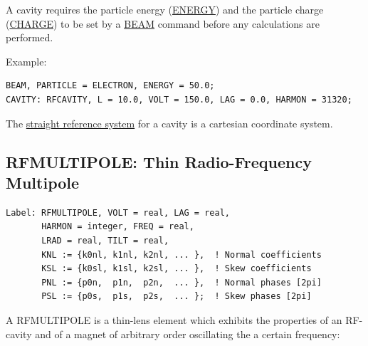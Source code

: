 A cavity requires the particle energy (\href{beam.html#energy}{ENERGY})
and the particle charge (\href{beam.html#charge}{CHARGE}) to be set by a
\href{beam.html}{BEAM} command before any calculations are performed.  

 Example: 
\begin{verbatim}
BEAM, PARTICLE = ELECTRON, ENERGY = 50.0;
CAVITY: RFCAVITY, L = 10.0, VOLT = 150.0, LAG = 0.0, HARMON = 31320;
\end{verbatim} 

The \href{local_system.html#straight}{straight reference system} for a
cavity is a cartesian coordinate system.  


%
\subsection{RFMULTIPOLE: Thin Radio-Frequency Multipole}
\begin{verbatim}
Label: RFMULTIPOLE, VOLT = real, LAG = real,
       HARMON = integer, FREQ = real,
       LRAD = real, TILT = real,
       KNL := {k0nl, k1nl, k2nl, ... },  ! Normal coefficients
       KSL := {k0sl, k1sl, k2sl, ... },  ! Skew coefficients
       PNL := {p0n,  p1n,  p2n,  ... },  ! Normal phases [2pi]
       PSL := {p0s,  p1s,  p2s,  ... };  ! Skew phases [2pi]
\end{verbatim} 

A RFMULTIPOLE is a thin-lens element which exhibits the properties
of an RF-cavity and of a magnet of arbitrary order oscillating the
a certain frequency:        
 
